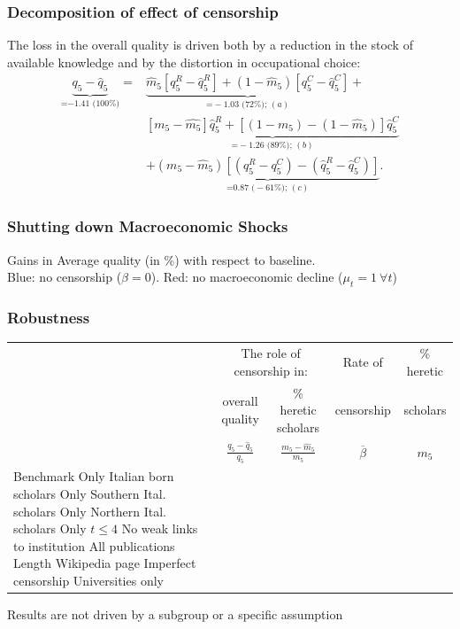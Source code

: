 \documentclass[usepdftitle=false,aspectratio=169,xcolor=dvipsnames]{beamer}
\begin{document}
 	\begin{frame}
\frametitle{Decomposition of effect of censorship}

 The loss in  the overall quality is  driven both by a reduction in the stock of available knowledge  and by the distortion in occupational choice:
\begin{equation}\label{eq:deco}
\begin{split}
\underbrace{q_5-\hat{q}_5}_{\text{=$-$1.41 (100\%)}}=&\underbrace{\hat{m}_5 [{q}^R_5-\hat{q}^R_5]+(1-\hat{m}_5)[q^C_5-\hat{q}^C_5]}_{\text{=$-$1.03 (72\%); $(a)$}}+\\&\underbrace{[m_5-\hat{m_5}]\hat{q}^R_5+[(1-m_5)-(1-\hat{m}_5)]\hat{q}^C_5}_{\text{=$-$1.26 (89\%); $(b)$}}\\&+\underbrace{(m_5-\hat{m}_5) [(q^R_5-q^C_5)-(\hat{q}^R_5-\hat{q}^C_5)]}_{\text{=0.87 ($-$61\%); $(c)$}}.
\end{split}
\end{equation}
 \end{frame}


 	\begin{frame}
\frametitle{Shutting down Macroeconomic Shocks}


  Gains in Average quality (in \%) with respect to baseline.\\ Blue: no censorship ($\beta=0$). Red: no macroeconomic decline ($\mu_t=1 \ \forall t$)


		\scalebox{0.43}{ }

  \end{frame}

 	\begin{frame}
\frametitle{Robustness}

\small
	\begin{tabular}{l|cc|c|c}
\hline
&  \multicolumn{2}{c}{The role of censorship in:} & Rate of & \% heretic\\ %
& overall quality  & \% heretic scholars & censorship & scholars  \\ %
&$\tfrac{q_5-\hat{q}_5}{q_5}$ &$\tfrac{m_5-\hat{m}_5}{m_5}$  &  $\overline{\beta}$ & $m_5$\\
\hline
Benchmark                        
Only Italian born scholars       
Only Southern Ital. scholars     
Only Northern Ital. scholars     
Only $t\leq 4$                  
No weak links to institution    
All publications                
Length Wikipedia page           
Imperfect censorship             
Universities only                \\
\hline
	\end{tabular}

Results are not driven by a subgroup or a specific assumption

 	\end{frame}
\end{document}
